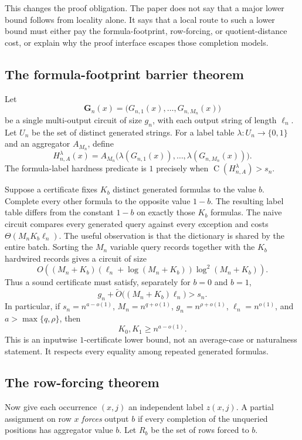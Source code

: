 \documentclass[11pt]{article}
\theoremstyle{definition}
\newcommand{\bits}{\{0,1\}}
\newcommand{\Ckt}{\operatorname{C}}
\newcommand{\Gn}{\mathbf{G}_n}
\begin{document}
This changes the proof obligation.  The paper does not say that a major lower bound follows from locality alone.  It says that a local route to such a lower bound must either pay the formula-footprint, row-forcing, or quotient-distance cost, or explain why the proof interface escapes those completion models.

\subsection{The formula-footprint barrier theorem}

Let
\[
  \Gn(x)=\bigl(G_{n,1}(x),\ldots,G_{n,M_n}(x)\bigr)
\]
be a single multi-output circuit of size $g_n$, with each output string of length $\ell_n$.  Let $U_n$ be the set of distinct generated strings.  For a label table $\lambda:U_n\to\bits$ and an aggregator $A_{M_n}$, define
\[
  H_{n,A}^{\lambda}(x)
  =A_{M_n}\bigl(\lambda(G_{n,1}(x)),\ldots,
                    \lambda(G_{n,M_n}(x))\bigr).
\]
The formula-label hardness predicate is $1$ precisely when $\Ckt(H_{n,A}^{\lambda})>s_n$.

Suppose a certificate fixes $K_b$ distinct generated formulas to the value $b$.  Complete every other formula to the opposite value $1-b$.  The resulting label table differs from the constant $1-b$ on exactly those $K_b$ formulas.  The naive circuit compares every generated query against every exception and costs $\Theta(M_nK_b\ell_n)$.  The useful observation is that the dictionary is shared by the entire batch.  Sorting the $M_n$ variable query records together with the $K_b$ hardwired records gives a circuit of size
\[
  O\!\left(
    (M_n+K_b)(\ell_n+\log(M_n+K_b))\log^2(M_n+K_b)
  \right).
\]
Thus a sound certificate must satisfy, separately for $b=0$ and $b=1$,
\[
  g_n+\widetilde O\bigl((M_n+K_b)\ell_n\bigr)>s_n.
\]
In particular, if $s_n=n^{a-o(1)}$, $M_n=n^{q+o(1)}$, $g_n=n^{\rho+o(1)}$, $\ell_n=n^{o(1)}$, and $a>\max\{q,\rho\}$, then
\[
  K_0,K_1\ge n^{a-o(1)}.
\]
This is an inputwise $1$-certificate lower bound, not an average-case or naturalness statement.  It respects every equality among repeated generated formulas.

\subsection{The row-forcing theorem}

Now give each occurrence $(x,j)$ an independent label $z(x,j)$.  A partial assignment on row $x$ \emph{forces} output $b$ if every completion of the unqueried positions has aggregator value $b$.  Let $R_b$ be the set of rows forced to $b$.
\end{document}
